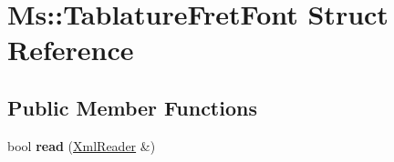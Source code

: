 \hypertarget{struct_ms_1_1_tablature_fret_font}{}\section{Ms\+:\+:Tablature\+Fret\+Font Struct Reference}
\label{struct_ms_1_1_tablature_fret_font}
\subsection*{Public Member Functions}
\begin{DoxyCompactItemize}
\item 
\mbox{\label{struct_ms_1_1_tablature_fret_font_a9030e128e312758ce7814f7102b68a8d}} 
bool {\bfseries read} (\hyperlink{class_ms_1_1_xml_reader}{Xml\+Reader} \&)
\end{DoxyCompactItemize}

